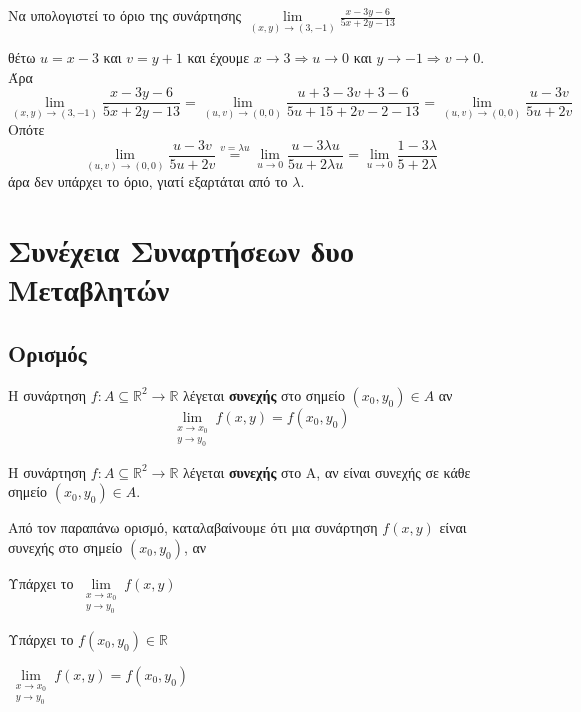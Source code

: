 \documentclass[a4paper,11pt]{report}
\begin{document}
\begin{example}
  Να υπολογιστεί το όριο της συνάρτησης 
  $ \lim\limits_{(x,y)\to (3, -1)} \frac{x-3y-6}{5x+2y-13} $ 
  \begin{solution}
    θέτω $ u=x-3 $ και $ v=y+1 $ και έχουμε $ x \to 3 \Rightarrow u \to 0 $ και 
    $ y \to -1 \Rightarrow v \to 0 $. Άρα
    \[
      \lim\limits_{(x,y)\to (3, -1)} \frac{x-3y-6}{5x+2y-13} = \lim_{(u,v) \to (0,0)} 
      \frac{u+3-3v+3-6}{5u+15+2v-2-13} = \lim_{(u,v) \to (0,0)} \frac{u-3v}{5u+2v}
    \] 
    Οπότε
    \[
      \lim_{(u,v) \to (0,0)} \frac{u-3v}{5u+2v} \overset{v= \lambda u}{=} 
      \lim_{u \to 0} \frac{u- 3 \lambda u}{5u + 2 \lambda u} = \lim_{u \to 0}
      \frac{1 - 3 \lambda}{5 + 2 \lambda}
    \]
    άρα δεν υπάρχει το όριο, γιατί εξαρτάται από το $ \lambda $.
  \end{solution}
\end{example}




\chapter{Συνέχεια Συναρτήσεων δυο Μεταβλητών}

\section{Ορισμός}

\begin{mybox1}
  \begin{dfn}
    Η συνάρτηση $ f \colon A \subseteq \mathbb{R}^{2} \to \mathbb{R} $ 
    λέγεται \textcolor{Col1}{\textbf{συνεχής}} στο σημείο $ (x_{0}, y_{0}) \in A $ αν 
    \[
      \lim\limits_{\substack{x\to x_{0} \\y \to y_{0}}} f(x,y) = f(x_{0}, y_{0})
    \]
  \end{dfn}
\end{mybox1}

\begin{mybox1}
  \begin{dfn}
    Η συνάρτηση $ f \colon A \subseteq \mathbb{R}^{2} \to \mathbb{R} $ 
    λέγεται \textcolor{Col1}{\textbf{συνεχής}} στο Α, αν είναι συνεχής σε κάθε σημείο 
    $ (x_{0}, y_{0}) \in A $.
  \end{dfn}
\end{mybox1}

\begin{rem}
  Από τον παραπάνω ορισμό, καταλαβαίνουμε ότι μια συνάρτηση $ f(x,y) $ 
  είναι συνεχής στο σημείο $ (x_{0}, y_{0}) $, αν
  \begin{myitemize}
    \item Υπάρχει το $ \lim\limits_{\substack{x\to x_{0} \\y \to y_{0}}} f(x,y) $
    \item Υπάρχει το $ f(x_{0}, y_{0}) \in \mathbb{R} $
    \item $  \lim\limits_{\substack{x\to x_{0} \\ y \to y_{0}}} f(x,y) = 
      f(x_{0}, y_{0}) $
  \end{myitemize}
\end{rem}
\end{document}
